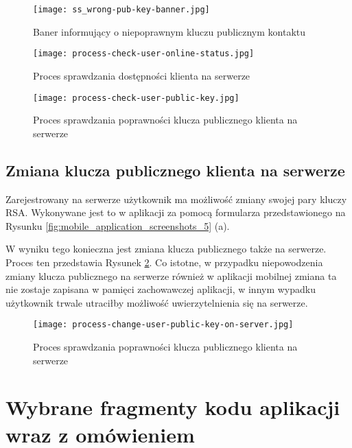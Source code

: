 \documentclass[../main.tex]{subfiles}
\begin{document}
\begin{figure}[H]
	\centering
	\texttt{[image: ss\_wrong-pub-key-banner.jpg]}
	\caption{Baner informujący o niepoprawnym kluczu publicznym kontaktu}
	\label{fig:wrong-user-public-key-banner}
\end{figure}

\begin{figure}[H]
	\centering
	\texttt{[image: process-check-user-online-status.jpg]}
	\caption{Proces sprawdzania dostępności klienta na serwerze}
\end{figure}

\begin{figure}[H]
	\centering
	\texttt{[image: process-check-user-public-key.jpg]}
	\caption{Proces sprawdzania poprawności klucza publicznego klienta na serwerze}
\end{figure}

\subsection{Zmiana klucza publicznego klienta na serwerze}

Zarejestrowany na serwerze użytkownik ma możliwość zmiany swojej pary kluczy RSA. Wykonywane jest to w aplikacji za pomocą formularza przedstawionego na Rysunku \ref{fig:mobile_application_screenshots_5} (a).

W wyniku tego konieczna jest zmiana klucza publicznego także na serwerze. Proces ten przedstawia Rysunek \ref{fig:user-public-key-change-process-diagram}. Co istotne, w przypadku niepowodzenia zmiany klucza publicznego na serwerze również w aplikacji mobilnej zmiana ta nie zostaje zapisana w pamięci zachowawczej aplikacji, w innym wypadku użytkownik trwale utraciłby możliwość uwierzytelnienia się na serwerze.

\begin{figure}[H]
	\centering
	\texttt{[image: process-change-user-public-key-on-server.jpg]}
	\caption{Proces sprawdzania poprawności klucza publicznego klienta na serwerze}
	\label{fig:user-public-key-change-process-diagram}
\end{figure}

\section{Wybrane fragmenty kodu aplikacji wraz z omówieniem}
\end{document}
